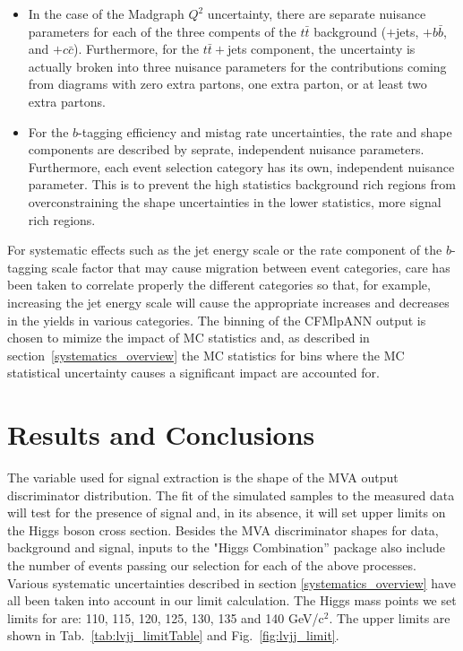 \begin{itemize}

  \item  In the case of the Madgraph $Q^2$ uncertainty, there are
    separate nuisance parameters for each of the three compents of the
    $t\bar{t}$ background ($+$jets, $+b\bar{b}$, and $+c\bar{c}$).
    Furthermore, for the $t\bar{t}+$jets component, the uncertainty is
    actually broken into three nuisance parameters for the
    contributions coming from diagrams with zero extra partons, one
    extra parton, or at least two extra partons. 

  \item For the $b$-tagging efficiency and mistag rate uncertainties,
    the rate and shape components are described by seprate,
    independent nuisance parameters.  Furthermore, each event
    selection category has its own, independent nuisance parameter.
    This is to prevent the high statistics background rich regions
    from overconstraining the shape uncertainties in the lower
    statistics, more signal rich regions. 

\end{itemize}

\par For systematic effects such as the jet energy scale or the rate
component of the $b$-tagging scale factor that may cause migration
between event categories, care has been taken to correlate properly
the different categories so that, for example, increasing the jet
energy scale will cause the appropriate increases and decreases in the
yields in various categories.  The binning of the CFMlpANN output is
chosen to mimize the impact of MC statistics and, as described in 
section~\ref{systematics_overview} the MC statistics for bins where
the MC statistical uncertainty causes a significant impact are
accounted for. 


\section{Results and Conclusions}
\label{results_and_conclusions_overview}

\par The variable used for signal extraction is the shape of the MVA
output discriminator distribution.  The fit of the simulated samples
to the measured data will test for the presence of signal and, in its
absence, it will set upper limits on the Higgs boson cross
section. Besides the MVA discriminator shapes for data, background 
and signal, inputs to the "Higgs Combination'' package also include
the number of events passing our selection for each of the above
processes. Various systematic uncertainties described in
section \ref{systematics_overview} have all been taken into account in our
limit calculation. The Higgs mass points we set limits for are: 110,
115, 120, 125, 130, 135 and 140 GeV/c$^2$.  The upper limits are shown
in Tab.~\ref{tab:lvjj_limitTable} and Fig.~\ref{fig:lvjj_limit}.    

